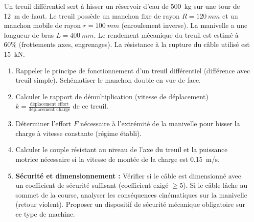 \documentclass[11pt]{article}
\begin{document}
\begin{exercice}
Un treuil diff\'erentiel sert \`a hisser un r\'eservoir d'eau de \SI{500}{kg} sur une tour de \SI{12}{m} de haut. Le treuil poss\`ede un manchon fixe de rayon $R = \SI{120}{mm}$ et un manchon mobile de rayon $r = \SI{100}{mm}$ (enroulement inverse). La manivelle a une longueur de bras $L = \SI{400}{mm}$. Le rendement m\'ecanique du treuil est estim\'e \`a 60\% (frottements axes, engrenages). La r\'esistance \`a la rupture du c\^able utilis\'e est \SI{15}{kN}.
\begin{enumerate}
    \item Rappeler le principe de fonctionnement d'un treuil diff\'erentiel (diff\'erence avec treuil simple). Sch\'ematiser le manchon double en vue de face.
    \item Calculer le rapport de d\'emultiplication (vitesse de d\'eplacement) $k = \frac{\text{d\'eplacement effort}}{\text{d\'eplacement charge}}$ de ce treuil.
    \item D\'eterminer l'effort $F$ n\'ecessaire \`a l'extr\'emit\'e de la manivelle pour hisser la charge \`a vitesse constante (r\'egime \'etabli).
    \item Calculer le couple r\'esistant au niveau de l'axe du treuil et la puissance motrice n\'ecessaire si la vitesse de mont\'ee de la charge est \SI{0,15}{m/s}.
    \item \textbf{S\'ecurit\'e et dimensionnement :} V\'erifier si le c\^able est dimensionn\'e avec un coefficient de s\'ecurit\'e suffisant (coefficient exig\'e $\ge 5$). Si le c\^able l\^ache au sommet de la course, analyser les cons\'equences cin\'ematiques sur la manivelle (retour violent). Proposer un dispositif de s\'ecurit\'e m\'ecanique obligatoire sur ce type de machine.
\end{enumerate}
\end{exercice}
\end{document}
